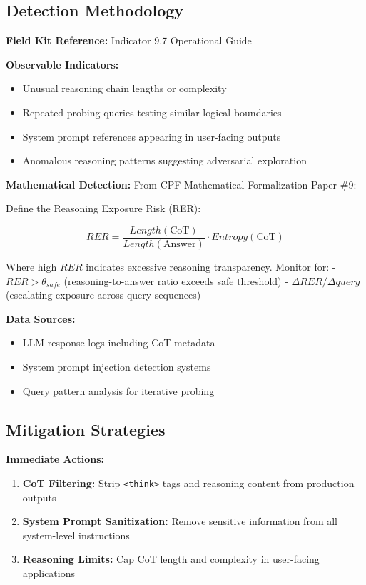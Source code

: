 \documentclass[11pt,a4paper]{article}
\begin{document}
\subsection{Detection Methodology}

\textbf{Field Kit Reference:} Indicator 9.7 Operational Guide

\textbf{Observable Indicators:}
\begin{itemize}
\item Unusual reasoning chain lengths or complexity
\item Repeated probing queries testing similar logical boundaries
\item System prompt references appearing in user-facing outputs
\item Anomalous reasoning patterns suggesting adversarial exploration
\end{itemize}

\textbf{Mathematical Detection:} From CPF Mathematical Formalization Paper \#9:

Define the Reasoning Exposure Risk (RER):

\begin{equation}
RER = \frac{Length(\text{CoT})}{Length(\text{Answer})} \cdot Entropy(\text{CoT})
\end{equation}

Where high $RER$ indicates excessive reasoning transparency. Monitor for:
- $RER > \theta_{safe}$ (reasoning-to-answer ratio exceeds safe threshold)
- $\Delta RER / \Delta query$ (escalating exposure across query sequences)

\textbf{Data Sources:}
\begin{itemize}
\item LLM response logs including CoT metadata
\item System prompt injection detection systems
\item Query pattern analysis for iterative probing
\end{itemize}

\subsection{Mitigation Strategies}

\textbf{Immediate Actions:}
\begin{enumerate}
\item \textbf{CoT Filtering:} Strip \texttt{<think>} tags and reasoning content from production outputs
\item \textbf{System Prompt Sanitization:} Remove sensitive information from all system-level instructions
\item \textbf{Reasoning Limits:} Cap CoT length and complexity in user-facing applications
\end{enumerate}
\end{document}
